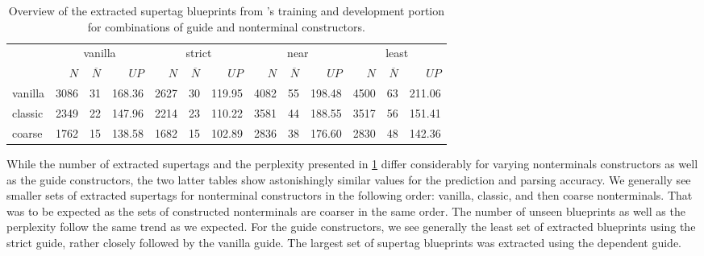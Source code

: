 \documentclass[../../document.tex]{subfiles}
\begin{document}
    \begin{table}
        \caption{\label{tbl:gridsearch:1:1}
            Overview of the extracted supertag blueprints from \negra{}'s training and development portion for combinations of guide and nonterminal constructors.
        }
        \centering
        \setlength{\tabcolsep}{5pt}
        \vspace{.2cm}
        \begin{tabular}{l|rrr|rrr|rrr|rrr}
            \toprule
                        & \multicolumn{3}{c|}{vanilla} & \multicolumn{3}{c|}{strict} & \multicolumn{3}{c|}{near} & \multicolumn{3}{c}{least} \\
                        & $N$ & $\overline{N}$ & $\mathit{UP}$ & $N$ & $\overline{N}$ & $\mathit{UP}$ & $N$ & $\overline{N}$ & $\mathit{UP}$ & $N$ & $\overline{N}$ & $\mathit{UP}$ \\ \hline
            vanilla     & 3086 & 31 & 168.36 & 2627 & 30 & 119.95 & 4082 & 55 & 198.48 & 4500 & 63 & 211.06 \\
            classic     & 2349 & 22 & 147.96 & 2214 & 23 & 110.22 & 3581 & 44 & 188.55 & 3517 & 56 & 151.41 \\
            coarse      & 1762 & 15 & 138.58 & 1682 & 15 & 102.89 & 2836 & 38 & 176.60 & 2830 & 48 & 142.36 \\
            \bottomrule
        \end{tabular}
    \end{table}
    
    While the number of extracted supertags and the perplexity presented in \cref{tbl:gridsearch:1:1} differ considerably for varying nonterminals constructors as well as the guide constructors, the two latter tables show astonishingly similar values for the prediction and parsing accuracy.
    We generally see smaller sets of extracted supertags for nonterminal constructors in the following order: vanilla, classic, and then coarse nonterminals.
    That was to be expected as the sets of constructed nonterminals are coarser in the same order.
    The number of unseen blueprints as well as the perplexity follow the same trend as we expected.
    For the guide constructors, we see generally the least set of extracted blueprints using the strict guide, rather closely followed by the vanilla guide.
    The largest set of supertag blueprints was extracted using the dependent guide.
    
\end{document}
